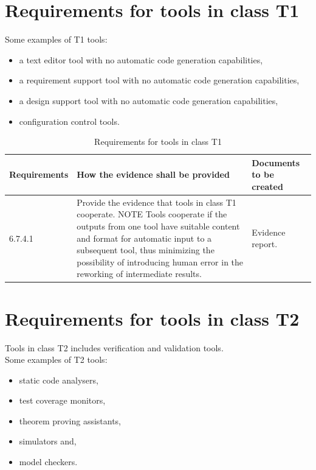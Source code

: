 \documentclass{template/openetcs_report}
\begin{document}
\section{Requirements for tools in class T1}
\label{T1}
Some examples of T1 tools:
\begin{itemize}\itemsep=0pt
  \item a text editor tool with no automatic code generation capabilities,
  \item a requirement support tool with no automatic code generation capabilities,
  \item a design support tool with no automatic code generation capabilities,
  \item configuration control tools.
\end{itemize}

{\footnotesize\sffamily\centering
\begin{longtable}{|p{2cm}|p{9cm}|p{3cm}|}
\caption{Requirements for tools in class T1}\\
\hline
\bfseries Requirements & \bfseries How the evidence shall be provided & \bfseries Documents to be created\\
\hline
\hline
\endhead
\hline
\endfoot

6.7.4.1 & Provide the evidence that tools in class T1 cooperate.
\linebreak
\linebreak
NOTE \linebreak
Tools cooperate if the outputs from one tool have suitable content and format for automatic input to a subsequent tool, thus minimizing the possibility of introducing human error in the reworking of intermediate results. & Evidence report.\\ 
\hline

\end{longtable}}



\section{Requirements for tools in class T2}
\label{T2}
Tools in class T2 includes verification and validation tools.\\
Some examples of T2 tools:
\begin{itemize}\itemsep=0pt
  \item static code analysers,
  \item test coverage monitors,
  \item theorem proving assistants,
  \item simulators and,
  \item model checkers.
\end{itemize}
\end{document}
